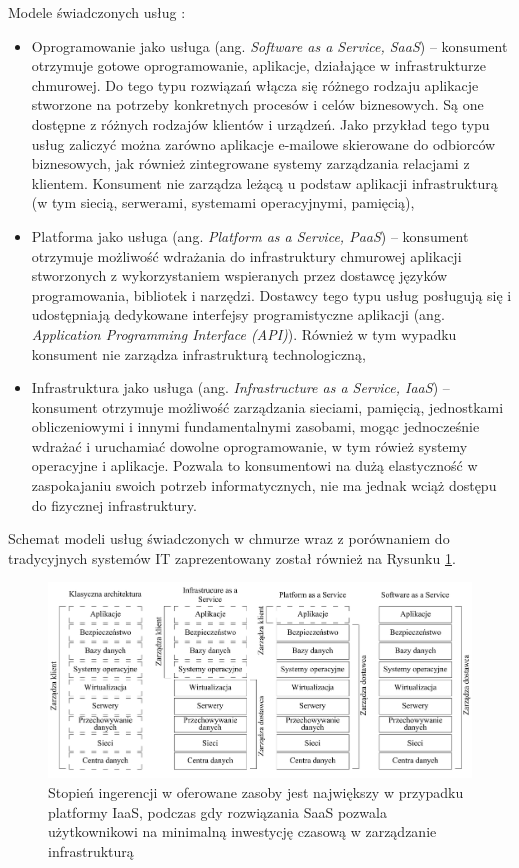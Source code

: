 \documentclass[12pt,a4paper,twoside]{article}
\begin{document}
\noindent
Modele świadczonych usług :
\begin{itemize}
\item Oprogramowanie jako usługa (ang. \textit{Software as a Service, SaaS}) -- konsument otrzymuje gotowe oprogramowanie, aplikacje, działające w infrastrukturze chmurowej. Do tego typu rozwiązań włącza się różnego rodzaju aplikacje stworzone na potrzeby konkretnych procesów i celów biznesowych. Są one dostępne z różnych rodzajów klientów i urządzeń. Jako przykład tego typu usług zaliczyć można zarówno aplikacje e-mailowe skierowane do odbiorców biznesowych, jak również zintegrowane systemy zarządzania relacjami z klientem. Konsument nie zarządza leżącą u podstaw aplikacji infrastrukturą (w tym siecią, serwerami, systemami operacyjnymi, pamięcią),
\item Platforma jako usługa (ang. \textit{Platform as a Service, PaaS}) -- konsument otrzymuje możliwość wdrażania do infrastruktury chmurowej aplikacji stworzonych z wykorzystaniem wspieranych przez dostawcę języków programowania, bibliotek i narzędzi. Dostawcy tego typu usług posługują się i udostępniają dedykowane interfejsy programistyczne aplikacji (ang. \textit{Application Programming Interface (API)}). Również w tym wypadku konsument nie zarządza infrastrukturą technologiczną,
\item Infrastruktura jako usługa (ang. \textit{Infrastructure as a Service, IaaS}) -- konsument otrzymuje możliwość zarządzania sieciami, pamięcią, jednostkami obliczeniowymi i innymi fundamentalnymi zasobami, mogąc jednocześnie wdrażać i uruchamiać dowolne oprogramowanie, w tym rówież systemy operacyjne i aplikacje. Pozwala to konsumentowi na dużą elastyczność w zaspokajaniu swoich potrzeb informatycznych, nie ma jednak wciąż dostępu do fizycznej infrastruktury.
\end{itemize}

Schemat modeli usług świadczonych w chmurze wraz z porównaniem do tradycyjnych systemów IT zaprezentowany został również na Rysunku \ref{fig:cloudarch}.

\begin{figure}[h]
  \centering
\includegraphics[width=\textwidth, keepaspectratio]{../obrazy/fig:cloudarch.png}
\caption{Stopień ingerencji w oferowane zasoby jest największy w przypadku platformy IaaS, podczas gdy rozwiązania SaaS pozwala użytkownikowi na minimalną inwestycję czasową w zarządzanie infrastrukturą \label{fig:cloudarch}}
\end{figure}
\end{document}
